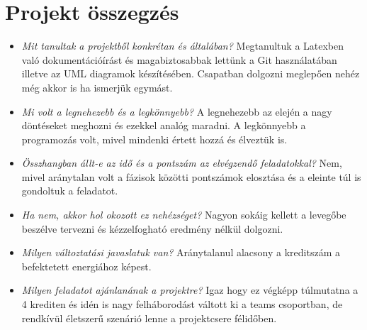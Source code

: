 \section{Projekt összegzés}
\begin{itemize}
\item \textit{Mit tanultak a projektből konkrétan és általában?} \newline
    Megtanultuk a Latexben való dokumentációírást és magabiztosabbak lettünk a Git használatában illetve az UML diagramok készítésében.
    Csapatban dolgozni meglepően nehéz még akkor is ha ismerjük egymást.
\item \textit{Mi volt a legnehezebb és a legkönnyebb?} \newline
    A legnehezebb az elején a nagy döntéseket meghozni és ezekkel analóg maradni.
    A legkönnyebb a programozás volt, mivel mindenki értett hozzá és élveztük is.
\item \textit{Összhangban állt-e az idő és a pontszám az elvégzendő feladatokkal?} \newline
    Nem, mivel aránytalan volt a fázisok közötti pontszámok elosztása és a eleinte túl is gondoltuk a feladatot.
\item \textit{Ha nem, akkor hol okozott ez nehézséget?} \newline
    Nagyon sokáig kellett a levegőbe beszélve tervezni és kézzelfogható eredmény nélkül dolgozni.
\item \textit{Milyen változtatási javaslatuk van?} \newline
    Aránytalanul alacsony a kreditszám a befektetett energiához képest.
\item \textit{Milyen feladatot ajánlanának a projektre?} \newline
    Igaz hogy ez végképp túlmutatna a 4 krediten és idén is nagy felháborodást váltott ki a teams csoportban, de rendkívül életszerű szenárió lenne a projektcsere félidőben.
\end{itemize}


